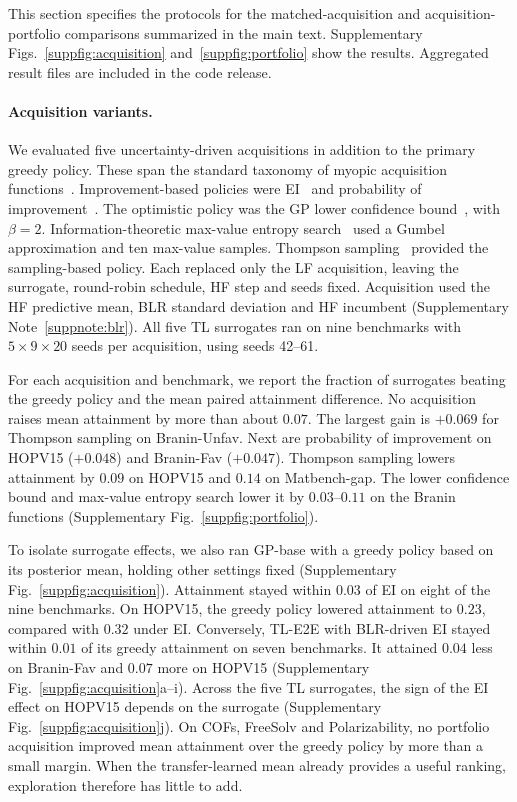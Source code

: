 
This section specifies the protocols for the matched-acquisition and acquisition-portfolio comparisons summarized in the main text. Supplementary Figs.~\ref{suppfig:acquisition} and~\ref{suppfig:portfolio} show the results. Aggregated result files are included in the code release.

\paragraph{Acquisition variants.} We evaluated five uncertainty-driven acquisitions in addition to the primary greedy policy. These span the standard taxonomy of myopic acquisition functions~\citep{shahriari2015taking}. Improvement-based policies were EI~\citep{jones1998efficient} and probability of improvement~\citep{kushner1964new}. The optimistic policy was the GP lower confidence bound~\citep{srinivas2012information}, with $\beta=2$. Information-theoretic max-value entropy search~\citep{wang2017max} used a Gumbel approximation and ten max-value samples. Thompson sampling~\citep{russo2018tutorial} provided the sampling-based policy. Each replaced only the LF acquisition, leaving the surrogate, round-robin schedule, HF step and seeds fixed. Acquisition used the HF predictive mean, BLR standard deviation and HF incumbent (Supplementary Note~\ref{suppnote:blr}). All five TL surrogates ran on nine benchmarks with $5\times 9\times 20$ seeds per acquisition, using seeds 42--61.

For each acquisition and benchmark, we report the fraction of surrogates beating the greedy policy and the mean paired attainment difference. No acquisition raises mean attainment by more than about $0.07$. The largest gain is $+0.069$ for Thompson sampling on Branin-Unfav. Next are probability of improvement on HOPV15 ($+0.048$) and Branin-Fav ($+0.047$). Thompson sampling lowers attainment by $0.09$ on HOPV15 and $0.14$ on Matbench-gap. The lower confidence bound and max-value entropy search lower it by $0.03$--$0.11$ on the Branin functions (Supplementary Fig.~\ref{suppfig:portfolio}).

To isolate surrogate effects, we also ran GP-base with a greedy policy based on its posterior mean, holding other settings fixed (Supplementary Fig.~\ref{suppfig:acquisition}). Attainment stayed within $0.03$ of EI on eight of the nine benchmarks. On HOPV15, the greedy policy lowered attainment to $0.23$, compared with $0.32$ under EI. Conversely, TL-E2E with BLR-driven EI stayed within $0.01$ of its greedy attainment on seven benchmarks. It attained $0.04$ less on Branin-Fav and $0.07$ more on HOPV15 (Supplementary Fig.~\ref{suppfig:acquisition}a--i). Across the five TL surrogates, the sign of the EI effect on HOPV15 depends on the surrogate (Supplementary Fig.~\ref{suppfig:acquisition}j). On COFs, FreeSolv and Polarizability, no portfolio acquisition improved mean attainment over the greedy policy by more than a small margin. When the transfer-learned mean already provides a useful ranking, exploration therefore has little to add.

